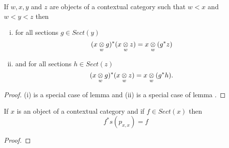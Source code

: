 \begin{lemma}
If $w,x,y$ and $z$ are objects of a contextual category \catcw such that $w < x$ and  $w < y < z$ then  
\begin{enumerate}[(i)]
\item for all sections $g \in Sect(y)$ 
\begin{equation*}
(\crossx{x}{g}{w})^*(\crossx{x}{z}{w})=\crossx{x}{(g^*z)}{w}
\end{equation*}
\item and for all sections $h \in Sect(z)$ 
\begin{equation*}
(\crossx{x}{g}{w})^*(\crossx{x}{z}{w})=\crossx{x}{(g^*h)}{w}.
\end{equation*}
\end{enumerate}
\end{lemma}
\begin{proof}
(i) is a special case of lemma 
and
(ii) is a special case of lemma .
\end{proof}

\begin{lemma}
If $x$ is an object of a contextual category \catcw and if $f \in Sect(x)$ then
\begin{equation*}
f^*s(p_{x,x}) =f
\end{equation*}
\end{lemma}
\begin{proof}
\tbd
\end{proof}



